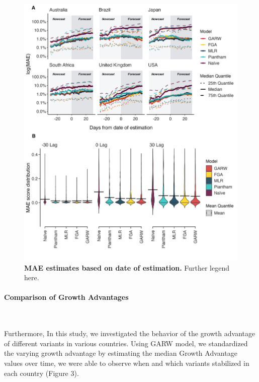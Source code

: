 \documentclass[11pt,oneside,letterpaper]{article}
\begin{document}
\begin{figure}[H]
	\centering
	\includegraphics[width=1.0\textwidth]{figures/Figure2.png}
	\caption{\textbf{MAE estimates based on date of estimation.} %
	Further legend here.
	}
	\label{Figure 2}
\end{figure}





\paragraph{Comparison of Growth Advantages}\

Furthermore, In this study, we investigated the behavior of the growth advantage of different variants in various countries.
Using GARW model, we standardized the varying growth advantage by estimating the median Growth Advantage values over time, we were able to observe when and which variants stabilized in each country (Figure 3). 
\end{document}
